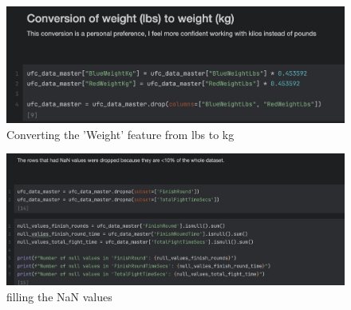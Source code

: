 \documentclass{article}
\begin{document}
\begin{figure}[H]
	\centering
	\includegraphics[width=1\textwidth]{images/Conversion_weight_lbs_to_kg.png}
	\caption{Converting the 'Weight' feature from lbs to kg}
	\label{fig:converting_weight}
\end{figure}

\begin{figure}[H]
	\centering
	\includegraphics[width=1\textwidth]{images/Filling_NaN_Values.png}
	\caption{filling the NaN values}
	\label{fig:filling_nan_values}
\end{figure}
\end{document}

